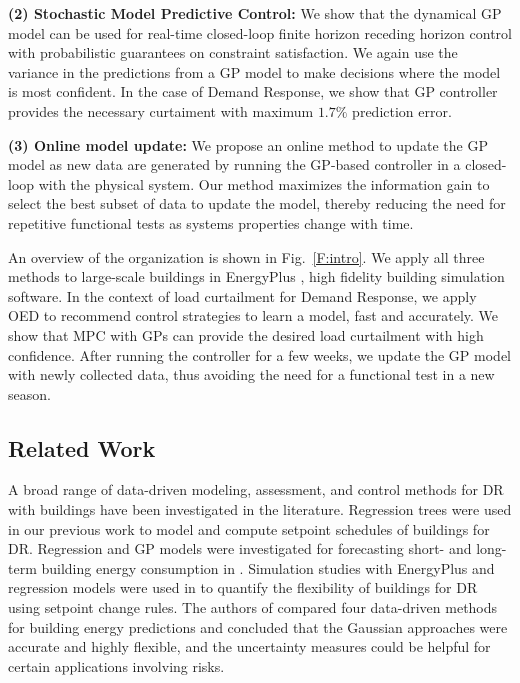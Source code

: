 \noindent \textbf{(2) Stochastic Model Predictive Control:} We show that the dynamical GP model can be used for real-time closed-loop finite horizon receding horizon control with probabilistic guarantees on constraint satisfaction. We again use the variance in the predictions from a GP model to make decisions where the model is most confident. In the case of Demand Response, we show that GP controller provides the necessary curtaiment with maximum \(1.7\% \) prediction error.
	
\noindent \textbf{(3) Online model update:} We propose an online method to update the GP model as new data are generated by running the GP-based controller in a closed-loop with the physical system.
Our method maximizes the information gain to select the best subset of data to update the model, thereby reducing the need for repetitive functional tests as systems properties change with time.

An overview of the organization is shown in Fig.~\ref{F:intro}.
We apply all three methods to large-scale buildings in EnergyPlus \cite{Deru2011}, high fidelity building simulation software.
In the context of load curtailment for Demand Response, we apply OED to recommend control strategies to learn a model, fast and accurately. We show that MPC with GPs can provide the desired load curtailment with high confidence. After running the controller for a few weeks, we update the GP model with newly collected data, thus avoiding the need for a functional test in a new season.


\subsection{Related Work}
A broad range of data-driven modeling, assessment, and control methods for DR with buildings have been investigated in the literature.
Regression trees were used in our previous work \cite{behletal15dradvisor,JainACC2017,JainCDC2017} to model and compute setpoint schedules of buildings for DR. 
Regression and GP models were investigated for forecasting short- and long-term building energy consumption in \cite{nohetal13data}.
Simulation studies with EnergyPlus and regression models were used in \cite{yinetal16quantifying} to quantify the flexibility of buildings for DR using setpoint change rules.
The authors of \cite{zhangetal15comparisons} compared four data-driven methods for building energy predictions and concluded that the Gaussian approaches were accurate and highly flexible, and the uncertainty measures could be helpful for certain applications involving risks.



